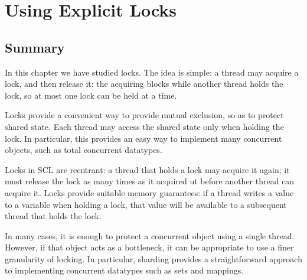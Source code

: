 \chapter{Using Explicit Locks} 
\label{chap:locks}



\section{Summary}

In this chapter we have studied locks.  The idea is simple: a thread may
acquire a lock, and then release it: the acquiring blocks while another thread
holds the lock, so at most one lock can be held at a time.  

Locks provide a convenient way to provide mutual exclusion, so as to protect
shared state.  Each thread may access the shared state only when holding the
lock.  In particular, this provides an easy way to implement many concurrent
objects, such as total concurrent datatypes.

Locks in SCL are reentrant: a thread that holds a lock may acquire it again;
it must release the lock as many times as it acquired ut before another thread
can acquire it.  Locks provide suitable memory guarantees: if a thread writes
a value to a variable when holding a lock, that value will be available to
a subsequent thread that holds the lock.

In many cases, it is enough to protect a concurrent object using a single
thread.  However, if that object acts as a bottleneck, it can be appropriate
to use a finer granularity of locking.  In particular, sharding provides a
straightforward approach to implementing concurrent datatypes such as sets and
mappings. 








\exercises









